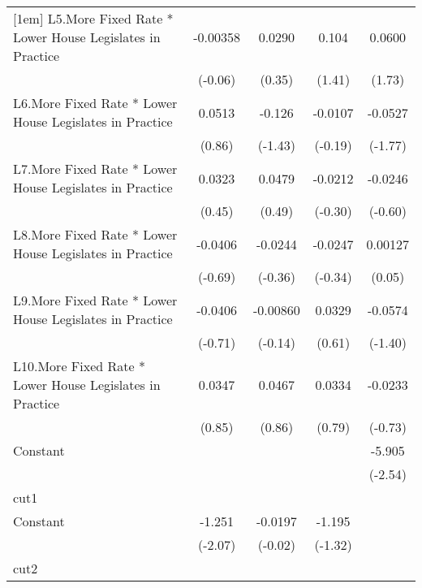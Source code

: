 {\begin{longtable}{l*{4}{c}}
[1em]
L5.More Fixed Rate * Lower House Legislates in Practice& -0.00358         &   0.0290         &    0.104         &   0.0600         \\
                &  (-0.06)         &   (0.35)         &   (1.41)         &   (1.73)         \\
[1em]
L6.More Fixed Rate * Lower House Legislates in Practice&   0.0513         &   -0.126         &  -0.0107         &  -0.0527         \\
                &   (0.86)         &  (-1.43)         &  (-0.19)         &  (-1.77)         \\
[1em]
L7.More Fixed Rate * Lower House Legislates in Practice&   0.0323         &   0.0479         &  -0.0212         &  -0.0246         \\
                &   (0.45)         &   (0.49)         &  (-0.30)         &  (-0.60)         \\
[1em]
L8.More Fixed Rate * Lower House Legislates in Practice&  -0.0406         &  -0.0244         &  -0.0247         &  0.00127         \\
                &  (-0.69)         &  (-0.36)         &  (-0.34)         &   (0.05)         \\
[1em]
L9.More Fixed Rate * Lower House Legislates in Practice&  -0.0406         & -0.00860         &   0.0329         &  -0.0574         \\
                &  (-0.71)         &  (-0.14)         &   (0.61)         &  (-1.40)         \\
[1em]
L10.More Fixed Rate * Lower House Legislates in Practice&   0.0347         &   0.0467         &   0.0334         &  -0.0233         \\
                &   (0.85)         &   (0.86)         &   (0.79)         &  (-0.73)         \\
[1em]
Constant        &                  &                  &                  &   -5.905\sym{*}  \\
                &                  &                  &                  &  (-2.54)         \\
\hline
cut1            &                  &                  &                  &                  \\
Constant        &   -1.251\sym{*}  &  -0.0197         &   -1.195         &                  \\
                &  (-2.07)         &  (-0.02)         &  (-1.32)         &                  \\
\hline
cut2            &                  &                  &                  &                  \\

\end{longtable}}
